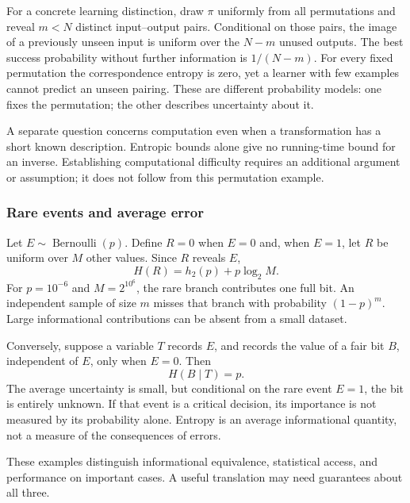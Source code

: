 \documentclass[11pt]{article}
\begin{document}
For a concrete learning distinction, draw $\pi$ uniformly from all permutations
and reveal $m<N$ distinct input--output pairs. Conditional on those pairs, the
image of a previously unseen input is uniform over the $N-m$ unused outputs. The best success
probability without further information is $1/(N-m)$. For every fixed permutation
the correspondence entropy is zero, yet a learner with few examples cannot
predict an unseen pairing. These are different probability models: one fixes
the permutation; the other describes uncertainty about it.

A separate question concerns computation even when a transformation has a short
known description. Entropic bounds alone give no running-time bound for an
inverse. Establishing computational difficulty requires an additional argument
or assumption; it does not follow from this permutation example.

\subsubsection{Rare events and average error}
Let $E\sim\operatorname{Bernoulli}(p)$. Define $R=0$ when $E=0$ and, when
$E=1$, let $R$ be uniform over $M$ other values. Since $R$ reveals $E$,
\[
 H(R)=h_2(p)+p\log_2 M.
\]
For $p=10^{-6}$ and $M=2^{10^6}$, the rare branch contributes one full bit.
An independent sample of size $m$ misses that branch with probability
$(1-p)^m$. Large informational contributions can be absent from a small
dataset.

Conversely, suppose a variable $T$ records $E$, and records the value of a fair
bit $B$, independent of $E$, only when $E=0$. Then
\[
 H(B\mid T)=p.
\]
The average uncertainty is small, but conditional on the rare event $E=1$, the
bit is entirely unknown. If that event is a critical decision, its importance
is not measured by its probability alone. Entropy is an average informational
quantity, not a measure of the consequences of errors.

These examples distinguish informational equivalence, statistical access, and
performance on important cases. A useful translation may need guarantees about
all three.
\end{document}
